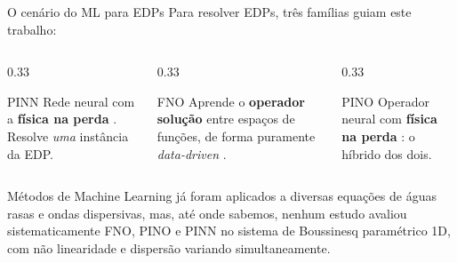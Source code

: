 \begin{frame}{O cenário do ML para EDPs}
  Para resolver EDPs, três famílias guiam este trabalho:
  \begin{columns}[T,totalwidth=\textwidth]
    \begin{column}{0.33\textwidth}
      \begin{block}{PINN}
        \footnotesize Rede neural com a \textbf{física na perda}
        \parencite{raissi2019}. Resolve \emph{uma} instância da EDP.
      \end{block}
    \end{column}
    \begin{column}{0.33\textwidth}
      \begin{block}{FNO}
        \footnotesize Aprende o \textbf{operador solução} entre espaços de funções, de
        forma puramente \emph{data-driven} \parencite{li2020fourier}.
      \end{block}
    \end{column}
    \begin{column}{0.33\textwidth}
      \begin{block}{PINO}
        \footnotesize Operador neural com \textbf{física na perda}
        \parencite{li2023pino}: o híbrido dos dois.
      \end{block}
    \end{column}
  \end{columns}

  \vspace{0.4cm}
  \begin{information}
    Métodos de Machine Learning já foram aplicados a diversas equações de águas rasas e ondas
    dispersivas, mas, até onde sabemos, \alert{nenhum estudo avaliou sistematicamente FNO,
    PINO e PINN no sistema de Boussinesq paramétrico 1D}, com não linearidade e dispersão
    variando simultaneamente.
  \end{information}
\end{frame}
